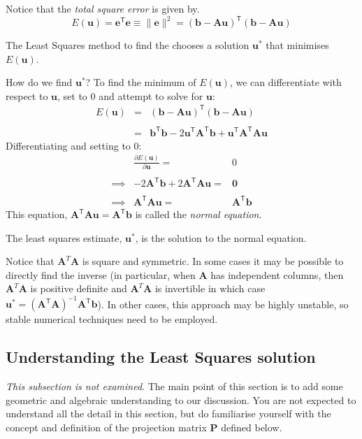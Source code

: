 Notice that the {\em total square error} is given by. 
\[ E(\mathbf u) = \mathbf{e}^{\mathsf{T}}\mathbf{e}\equiv\parallel\mathbf{e}\parallel^2
=(\mathbf{b}-\mathbf{Au})^{\mathsf{T}}(\mathbf{b}-\mathbf{Au})
\]

The Least Squares method  to find the chooses a solution $\mathbf u^*$ that minimises $E(\mathbf u)$.
 
How do we find $\mathbf u^*$?  To find the minimum of $E(\mathbf u)$, we can differentiate with respect to $\mathbf u$, set to 0 and attempt to solve for $\mathbf u$:
\[
\begin{array}{rcl}
 E(\mathbf{u}) &=&(\mathbf{b}-\mathbf{Au})^\mathsf{T}(\mathbf{b}-\mathbf{Au}) \\ \\ 
 &= & \mathbf{b}^\mathsf{T}\mathbf{b} - 2\mathbf{u}^\mathsf{T}\mathbf{A}^\mathsf{T}\mathbf{b}+\mathbf{u}^\mathsf{T} \mathbf{A}^\mathsf{T}\mathbf{A}\mathbf{u}
\end{array}
 \]
 Differentiating and setting to 0:
 \[
 \begin{array}{rrl}
  & \frac{\partial E(\mathbf{u})}{\partial \mathbf{u}} = & 0 \\ \\
\implies  & -2\mathbf{A}^\mathsf{T}\mathbf{b} + 2\mathbf{A}^\mathsf{T}\mathbf{A}\mathbf{u} = & \mathbf{0}\\ \\
\implies  & \mathbf{A}^\mathsf{T}\mathbf{A}\mathbf{u} =& \mathbf{A}^\mathsf{T}\mathbf{b} 
\end{array}
\]
This equation, $\mathbf{A}^\mathsf{T}\mathbf{A}\mathbf{u} = \mathbf{A}^\mathsf{T}\mathbf{b}  $ is called the {\em normal equation}.  

The least squares estimate, $\mathbf{u^*}$, is the solution  to the normal equation.

Notice that $\mathbf A^T \mathbf A$ is square and symmetric.    In some cases it may be possible to directly find the inverse (in particular, when $\mathbf A$ has independent columns, then $\mathbf A^T \mathbf A$ is  positive definite and $\mathbf A^T \mathbf A$ is invertible in which case $\mathbf u^* = ( \mathbf{A}^\mathsf{T}\mathbf{A})^{-1}\mathbf{A}^\mathsf{T}\mathbf{b}$).  In other cases, this approach may be highly unstable, so stable numerical techniques need to be employed.




\subsection{Understanding the Least Squares solution }
\label{sec:leastsqexplain}
{\em This subsection is not examined}.
The main point of this section is to add some geometric and algebraic understanding  to our discussion.  You are not expected to understand all the detail in this section, but do familiarise yourself with the concept and definition of the projection matrix $\mathbf P$ defined below.


